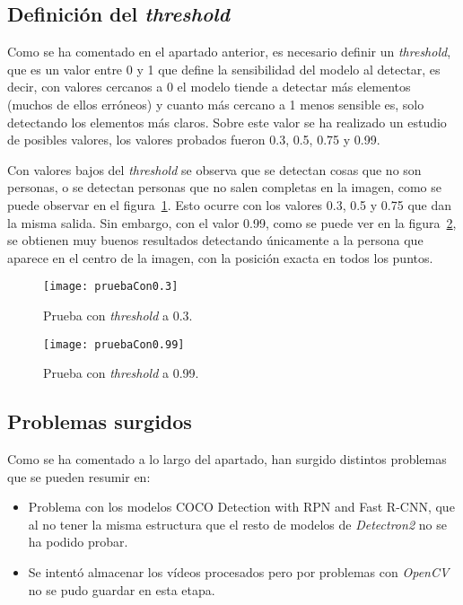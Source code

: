 {\subsection{Definición del \textit{threshold}}
Como se ha comentado en el apartado anterior, es necesario definir un \textit{threshold}, que es un valor entre 0 y 1 que define la sensibilidad del modelo al detectar, es decir, con valores cercanos a 0 el modelo tiende a detectar más elementos (muchos de ellos erróneos) y cuanto más cercano a 1 menos sensible es, solo detectando los elementos más claros. Sobre este valor se ha realizado un estudio de posibles valores, los valores probados fueron 0.3, 0.5, 0.75 y 0.99.

Con valores bajos del \textit{threshold} se observa que se detectan cosas que no son personas, o se detectan personas que no salen completas en la imagen, como se puede observar en el figura~\ref{fig:pruebaCon0.3}. Esto ocurre con los valores 0.3, 0.5 y 0.75 que dan la misma salida. Sin embargo, con el valor 0.99, como se puede ver en la figura~\ref{fig:pruebaCon0.99}, se obtienen muy buenos resultados detectando únicamente a la persona que aparece en el centro de la imagen, con la posición exacta en todos los puntos.

\begin{figure}[h]
	\centering
	\texttt{[image: pruebaCon0.3]}
	\caption{Prueba con \textit{threshold} a 0.3.}
	\label{fig:pruebaCon0.3}
\end{figure}

\begin{figure}[h]
	\centering
	\texttt{[image: pruebaCon0.99]}
	\caption{Prueba con \textit{threshold} a 0.99.}
	\label{fig:pruebaCon0.99}
\end{figure}

\subsection{Problemas surgidos}
Como se ha comentado a lo largo del apartado, han surgido distintos problemas que se pueden resumir en:
\begin{itemize}
	\item Problema con los modelos COCO Detection with RPN and Fast R-CNN, que al no tener la misma estructura que el resto de modelos de \textit{Detectron2} no se ha podido probar.
	\item Se intentó almacenar los vídeos procesados pero por problemas con \textit{OpenCV} no se pudo guardar en esta etapa.
\end{itemize}

}
